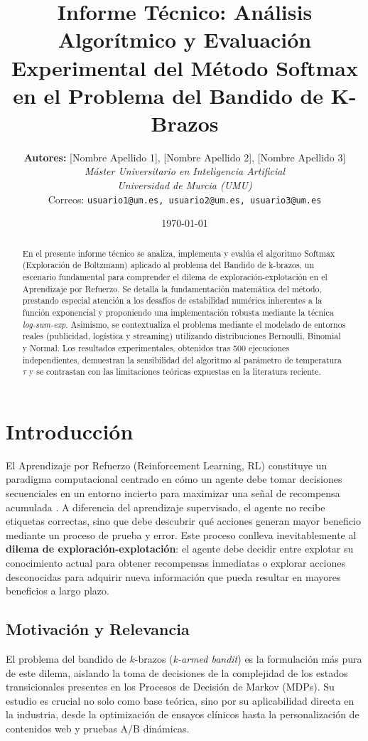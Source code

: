 \documentclass[a4paper,11pt]{article}
\title{\textbf{Informe Técnico: Análisis Algorítmico y Evaluación Experimental del Método Softmax en el Problema del Bandido de K-Brazos}}
\author{
    \textbf{Autores:} [Nombre Apellido 1], [Nombre Apellido 2], [Nombre Apellido 3] \\
    \textit{Máster Universitario en Inteligencia Artificial} \\
    \textit{Universidad de Murcia (UMU)} \\
    Correos: \texttt{usuario1@um.es, usuario2@um.es, usuario3@um.es}
}
\date{\today}
\begin{document}
\maketitle
\thispagestyle{empty}

\begin{abstract}
En el presente informe técnico se analiza, implementa y evalúa el algoritmo Softmax (Exploración de Boltzmann) aplicado al problema del Bandido de k-brazos, un escenario fundamental para comprender el dilema de exploración-explotación en el Aprendizaje por Refuerzo. Se detalla la fundamentación matemática del método, prestando especial atención a los desafíos de estabilidad numérica inherentes a la función exponencial y proponiendo una implementación robusta mediante la técnica \textit{log-sum-exp}. Asimismo, se contextualiza el problema mediante el modelado de entornos reales (publicidad, logística y streaming) utilizando distribuciones Bernoulli, Binomial y Normal. Los resultados experimentales, obtenidos tras 500 ejecuciones independientes, demuestran la sensibilidad del algoritmo al parámetro de temperatura $\tau$ y se contrastan con las limitaciones teóricas expuestas en la literatura reciente.
\end{abstract}

\tableofcontents
\newpage

\section{Introducción}

El Aprendizaje por Refuerzo (Reinforcement Learning, RL) constituye un paradigma computacional centrado en cómo un agente debe tomar decisiones secuenciales en un entorno incierto para maximizar una señal de recompensa acumulada \cite{sutton2018}. A diferencia del aprendizaje supervisado, el agente no recibe etiquetas correctas, sino que debe descubrir qué acciones generan mayor beneficio mediante un proceso de prueba y error. Este proceso conlleva inevitablemente al \textbf{dilema de exploración-explotación}: el agente debe decidir entre explotar su conocimiento actual para obtener recompensas inmediatas o explorar acciones desconocidas para adquirir nueva información que pueda resultar en mayores beneficios a largo plazo.

\subsection{Motivación y Relevancia}
El problema del bandido de $k$-brazos (\textit{k-armed bandit}) es la formulación más pura de este dilema, aislando la toma de decisiones de la complejidad de los estados transicionales presentes en los Procesos de Decisión de Markov (MDPs). Su estudio es crucial no solo como base teórica, sino por su aplicabilidad directa en la industria, desde la optimización de ensayos clínicos hasta la personalización de contenidos web y pruebas A/B dinámicas.
\end{document}
